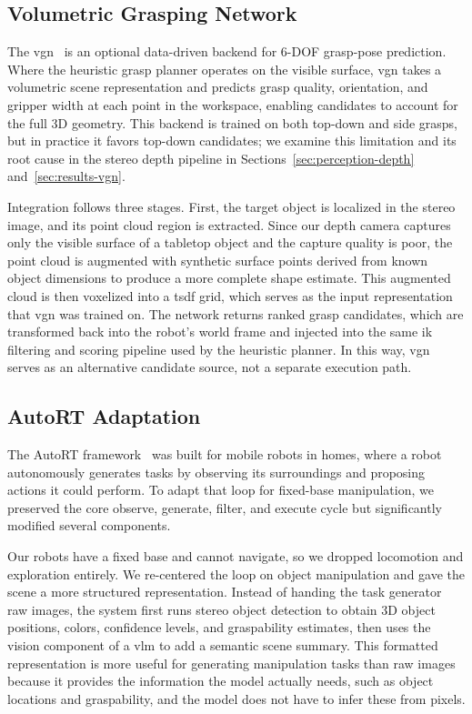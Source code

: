 \documentclass[
     12pt,
     a4paper,
     BCOR=10mm,
     DIV=14,
     listof=totoc,
     bibliography=totoc,
     parskip,
     twoside,
     headsepline
     ]{scrreprt}
\begin{document}
\subsection{Volumetric Grasping Network}\label{sec:vgn}
The \gls{vgn}~\cite{breyer2021volumetricgraspingnetworkrealtime} is an optional data-driven backend for 6-DOF grasp-pose prediction. Where the heuristic grasp planner operates on the visible surface, \gls{vgn} takes a volumetric scene representation and predicts grasp quality, orientation, and gripper width at each point in the workspace, enabling candidates to account for the full 3D geometry. This backend is trained on both top-down and side grasps, but in practice it favors top-down candidates; we examine this limitation and its root cause in the stereo depth pipeline in Sections~\ref{sec:perception-depth} and~\ref{sec:results-vgn}.

Integration follows three stages. First, the target object is localized in the stereo image, and its point cloud region is extracted. Since our depth camera captures only the visible surface of a tabletop object and the capture quality is poor, the point cloud is augmented with synthetic surface points derived from known object dimensions to produce a more complete shape estimate. This augmented cloud is then voxelized into a \gls{tsdf} grid, which serves as the input representation that \gls{vgn} was trained on. The network returns ranked grasp candidates, which are transformed back into the robot's world frame and injected into the same \gls{ik} filtering and scoring pipeline used by the heuristic planner. In this way, \gls{vgn} serves as an alternative candidate source, not a separate execution path.

\subsection{AutoRT Adaptation}\label{sec:autort}
The AutoRT framework~\cite{ahn2024autortembodiedfoundationmodels} was built for mobile robots in homes, where a robot autonomously generates tasks by observing its surroundings and proposing actions it could perform. To adapt that loop for fixed-base manipulation, we preserved the core observe, generate, filter, and execute cycle but significantly modified several components.

Our robots have a fixed base and cannot navigate, so we dropped locomotion and exploration entirely. We re-centered the loop on object manipulation and gave the scene a more structured representation. Instead of handing the task generator raw images, the system first runs stereo object detection to obtain 3D object positions, colors, confidence levels, and graspability estimates, then uses the vision component of a \gls{vlm} to add a semantic scene summary. This formatted representation is more useful for generating manipulation tasks than raw images because it provides the information the model actually needs, such as object locations and graspability, and the model does not have to infer these from pixels.
\end{document}
